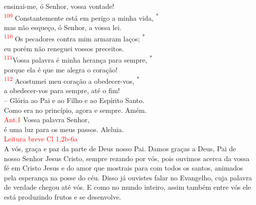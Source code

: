 \documentclass{book}
\begin{document}
\begin{center}
    ensinai-me, ó Senhor, vossa vontade!
    \vspace{.2cm} \\
    \textsuperscript{\underline{\hspace{.07in}}\textcolor{red}{109}} Constantemente está em perigo a minha vida, \textsuperscript{*} \\
    mas não esqueço, ó Senhor, a vossa lei. \\
    \textsuperscript{\underline{\hspace{.07in}}\textcolor{red}{110}} Os pecadores contra mim armaram laços; \textsuperscript{*} \\
    eu porém não reneguei vossos preceitos.
    \vspace{.2cm} \\
    \textsuperscript{\underline{\hspace{.07in}}\textcolor{red}{111}}Vossa palavra é minha herança para sempre, \textsuperscript{*} \\
    porque ela é que me alegra o coração! \\
    \textsuperscript{\underline{\hspace{.07in}}\textcolor{red}{112}} Acostumei meu coração a obedecer-vos, \textsuperscript{*} \\
    a obedecer-vos para sempre, até o fim!
    \vspace{.2cm} \\
    -- Glória ao Pai e ao Filho e ao Espírito Santo. \\
    Como era no princípio, agora e sempre. Amém.
    \vspace{.2cm} \\
    \textcolor{red}{Ant.1} Vossa palavra Senhor, \\
    é uma luz para os meus passos. Aleluia.
    \vspace{.2cm} \\
    \textcolor{red}{Leitura breve Cl 1,2b-6a}
    \vspace{.2cm} \\
    A vós, graça e paz da parte de Deus nosso Pai. Damos graças a Deus, Pai de nosso Senhor Jesus Cristo, sempre rezando por vós, pois ouvimos acerca da vossa fé em Cristo Jesus e do amor que mostrais para com todos os santos, animados pela esperança na posse do céu. Disso já ouvistes falar no Evangelho, cuja palavra de verdade chegou até vós. E como no mundo inteiro, assim também entre vós ele está produzindo frutos e se desenvolve.
    \vspace{.2cm} \\

\end{center}
\end{document}
